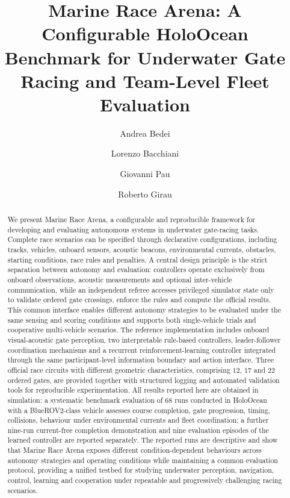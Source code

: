 \documentclass[preprint,3p,times]{elsarticle}
\begin{document}
\begin{frontmatter}

\title{Marine Race Arena: A Configurable HoloOcean Benchmark for Underwater
Gate Racing and Team-Level Fleet Evaluation}

\author[unibo]{Andrea Bedei}
\author[unibo]{Lorenzo Bacchiani}
\author[unibo]{Giovanni Pau}
\author[unibo]{Roberto Girau}


\begin{abstract}
We present Marine Race Arena, a configurable and reproducible framework for developing and evaluating autonomous systems in underwater gate-racing tasks. Complete race scenarios can be specified through declarative configurations, including tracks, vehicles, onboard sensors, acoustic beacons, environmental currents, obstacles, starting conditions, race rules and penalties. A central design principle is the strict separation between autonomy and evaluation: controllers operate exclusively from onboard observations, acoustic measurements and optional inter-vehicle communication, while an independent referee accesses privileged simulator state only to validate ordered gate crossings, enforce the rules and compute the official results. This common interface enables different autonomy strategies to be evaluated under the same sensing and scoring conditions and supports both single-vehicle trials and cooperative multi-vehicle scenarios. The reference implementation includes onboard visual-acoustic gate perception, two interpretable rule-based controllers, leader-follower coordination mechanisms and a recurrent reinforcement-learning controller integrated through the same participant-level information boundary and action interface. Three official race circuits with different geometric characteristics, comprising $12$, $17$ and $22$ ordered gates, are provided together with structured logging and automated validation tools for reproducible experimentation. All results reported here are obtained in simulation: a systematic benchmark evaluation of $68$ runs conducted in HoloOcean with a BlueROV2-class vehicle assesses course completion, gate progression, timing, collisions, behaviour under environmental currents and fleet coordination; a further nine-run current-free completion demonstration and nine evaluation episodes of the learned controller are reported separately. The reported runs are descriptive and show that Marine Race Arena exposes different condition-dependent behaviours across autonomy strategies and operating conditions while maintaining a common evaluation protocol, providing a unified testbed for studying underwater perception, navigation, control, learning and cooperation under repeatable and progressively challenging racing scenarios.
\end{abstract}


\end{frontmatter}
\end{document}
